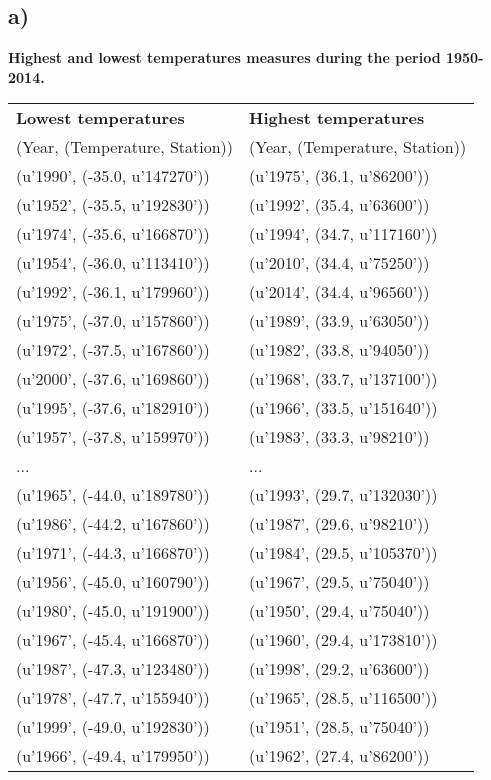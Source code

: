 \documentclass[a4paper,titlepage,12pt]{article}
\begin{document}
\subsection{a)}
\textbf{Highest and lowest temperatures measures during the period 1950-2014.}
\begin{tabular}{l | l}
  \bf Lowest temperatures & \bf Highest temperatures \\ 
  (Year, (Temperature, Station)) & (Year, (Temperature, Station)) \\
  \hline
  (u'1990', (-35.0, u'147270')) & (u'1975', (36.1, u'86200')) \\ 
  (u'1952', (-35.5, u'192830')) & (u'1992', (35.4, u'63600')) \\ 
  (u'1974', (-35.6, u'166870')) & (u'1994', (34.7, u'117160')) \\
  (u'1954', (-36.0, u'113410')) & (u'2010', (34.4, u'75250')) \\
  (u'1992', (-36.1, u'179960')) & (u'2014', (34.4, u'96560')) \\
  (u'1975', (-37.0, u'157860')) & (u'1989', (33.9, u'63050')) \\
  (u'1972', (-37.5, u'167860')) & (u'1982', (33.8, u'94050')) \\
  (u'2000', (-37.6, u'169860')) & (u'1968', (33.7, u'137100')) \\
  (u'1995', (-37.6, u'182910')) & (u'1966', (33.5, u'151640')) \\
  (u'1957', (-37.8, u'159970')) & (u'1983', (33.3, u'98210')) \\
  ... & ... \\
  (u'1965', (-44.0, u'189780')) & (u'1993', (29.7, u'132030')) \\
  (u'1986', (-44.2, u'167860')) & (u'1987', (29.6, u'98210')) \\
  (u'1971', (-44.3, u'166870')) & (u'1984', (29.5, u'105370')) \\
  (u'1956', (-45.0, u'160790')) & (u'1967', (29.5, u'75040')) \\
  (u'1980', (-45.0, u'191900')) & (u'1950', (29.4, u'75040')) \\
  (u'1967', (-45.4, u'166870')) & (u'1960', (29.4, u'173810')) \\
  (u'1987', (-47.3, u'123480')) & (u'1998', (29.2, u'63600')) \\
  (u'1978', (-47.7, u'155940')) & (u'1965', (28.5, u'116500')) \\
  (u'1999', (-49.0, u'192830')) & (u'1951', (28.5, u'75040')) \\
  (u'1966', (-49.4, u'179950')) & (u'1962', (27.4, u'86200')) \\
\end{tabular}
\end{document}
